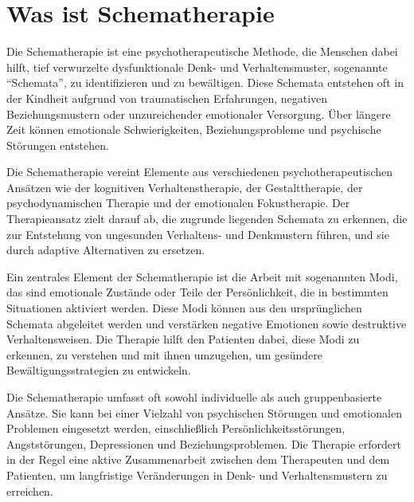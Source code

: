 \section{Was ist Schematherapie}
Die Schematherapie ist eine psychotherapeutische Methode, die Menschen dabei hilft, tief verwurzelte dysfunktionale Denk- und Verhaltensmuster, sogenannte \enquote{Schemata}, zu identifizieren und zu bewältigen. Diese Schemata entstehen oft in der Kindheit aufgrund von traumatischen Erfahrungen, negativen Beziehungsmustern oder unzureichender emotionaler Versorgung. Über längere Zeit können emotionale Schwierigkeiten, Beziehungsprobleme und psychische Störungen entstehen.

Die Schematherapie vereint Elemente aus verschiedenen psychotherapeutischen Ansätzen wie der kognitiven Verhaltenstherapie, der Gestalttherapie, der psychodynamischen Therapie und der emotionalen Fokustherapie. Der Therapieansatz zielt darauf ab, die zugrunde liegenden Schemata zu erkennen, die zur Entstehung von ungesunden Verhaltens- und Denkmustern führen, und sie durch adaptive Alternativen zu ersetzen.

Ein zentrales Element der Schematherapie ist die Arbeit mit sogenannten Modi, das sind emotionale Zustände oder Teile der Persönlichkeit, die in bestimmten Situationen aktiviert werden. Diese Modi können aus den ursprünglichen Schemata abgeleitet werden und verstärken negative Emotionen sowie destruktive Verhaltensweisen. Die Therapie hilft den Patienten dabei, diese Modi zu erkennen, zu verstehen und mit ihnen umzugehen, um gesündere Bewältigungsstrategien zu entwickeln.

Die Schematherapie umfasst oft sowohl individuelle als auch gruppenbasierte Ansätze. Sie kann bei einer Vielzahl von psychischen Störungen und emotionalen Problemen eingesetzt werden, einschließlich Persönlichkeitsstörungen, Angststörungen, Depressionen und Beziehungsproblemen. Die Therapie erfordert in der Regel eine aktive Zusammenarbeit zwischen dem Therapeuten und dem Patienten, um langfristige Veränderungen in Denk- und Verhaltensmustern zu erreichen.